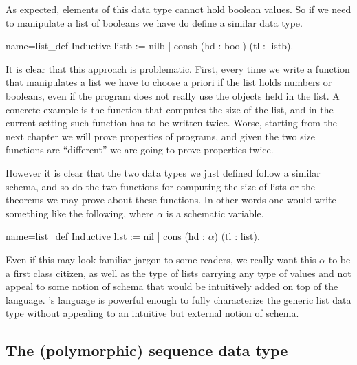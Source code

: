 As expected, elements of this data type cannot hold boolean values.
So if we need to
manipulate a list of booleans we have do define a similar data type.

\begin{coq}{name=list_def}{}
Inductive listb := nilb | consb (hd : bool) (tl : listb).
\end{coq}

It is clear that this approach is problematic.  First, every time we
write a function that manipulates a list we have to choose a priori
if the list holds numbers or booleans, even if the program does not
really use the objects held in the list.
A concrete example is the function that computes the size of the list,
and in the current setting such function has to be written twice.
Worse, starting from the next chapter we will prove properties of programs,
and given the two size functions are ``different'' we are going to prove
properties twice.

However it is clear that the two data types we just defined follow
a similar schema, and so do the two functions for computing the size of lists
or the theorems we may prove about these functions.  In other words
one would write something
like the following, where $\alpha$ is a schematic variable.

\begin{coq}{name=list_def}{}
Inductive list := nil | cons (hd : $\alpha$) (tl : list).
\end{coq}

\noindent Even if this may look familiar jargon to some readers, we really want
this $\alpha$ to be a first class citizen, as well as the type of lists carrying
any type of values and not appeal to some notion of schema that would be
intuitively added on top of the \Coq{} language. %
%
\Coq{}'s language is powerful enough to fully characterize the generic
list data type without appealing to an intuitive but external notion of
schema.

\subsection{The (polymorphic) sequence data type}

